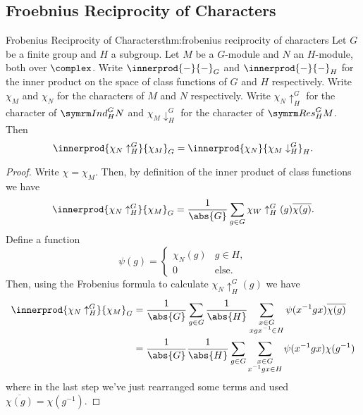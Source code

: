 \subsection{Froebnius Reciprocity of Characters}
\begin{thm}{Frobenius Reciprocity of Characters}{thm:frobenius reciprocity of characters}
    Let \(G\) be a finite group and \(H\) a subgroup.
    Let \(M\) be a \(G\)-module and \(N\) an \(H\)-module, both over \(\complex\).
    Write \(\innerprod{-}{-}_G\) and \(\innerprod{-}{-}_H\) for the inner product on the space of class functions of \(G\) and \(H\) respectively.
    Write \(\chi_M\) and \(\chi_N\) for the characters of \(M\) and \(N\) respectively.
    Write \(\chi_N\uparrow^G_H\) for the character of \(\Ind^G_HN\) and \(\chi_M\downarrow^G_H\) for the character of \(\Res^G_HM\).
    Then
    \begin{equation}
        \innerprod{\chi_N\uparrow^G_H}{\chi_M}_G = \innerprod{\chi_N}{\chi_M\downarrow^G_H}_H.
    \end{equation}
    \begin{proof}
        Write \(\chi = \chi_M\).
        Then, by definition of the inner product of class functions we have
        \begin{equation}
            \innerprod{\chi_N\uparrow^G_H}{\chi_M}_G = \frac{1}{\abs{G}} \sum_{g \in G} \chi_W\uparrow^G_H(g) \overline{\chi(g)}.
        \end{equation}
        Define a function
        \begin{equation}
            \psi(g) = 
            \begin{cases}
                \chi_N(g) & g \in H,\\
                0 & \text{else}.
            \end{cases}
        \end{equation}
        Then, using the Frobenius formula to calculate \(\chi_N\uparrow^G_H(g)\) we have
        \begin{align}
            \innerprod{\chi_N\uparrow^G_H}{\chi_M}_G &= \frac{1}{\abs{G}} \sum_{g \in G} \frac{1}{\abs{H}} \sum_{\substack{x \in G\\ xgx^{-1} \in H}} \psi(x^{-1}gx) \overline{\chi(g)}\\
            &= \frac{1}{\abs{G}} \frac{1}{\abs{H}} \sum_{g \in G} \sum_{\substack{x \in G\\ x^{-1}gx \in H}} \psi(x^{-1}gx) \chi(g^{-1})
        \end{align}
        where in the last step we've just rearranged some terms and used \(\overline{\chi(g)} = \chi(g^{-1})\).

\end{proof}
\end{thm}
